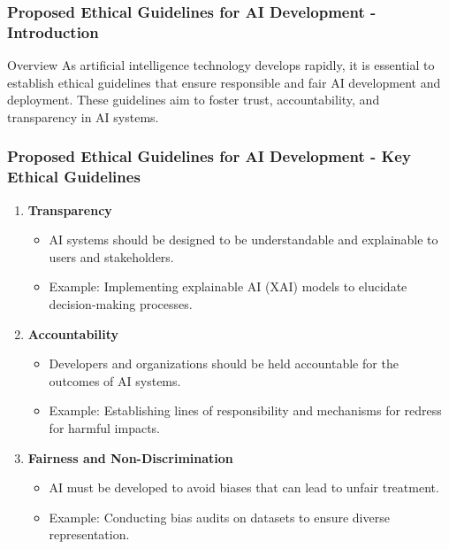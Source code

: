 \documentclass{beamer}
\begin{document}
\begin{frame}[fragile]
    \frametitle{Proposed Ethical Guidelines for AI Development - Introduction}
    \begin{block}{Overview}
        As artificial intelligence technology develops rapidly, it is essential to establish ethical guidelines that ensure responsible and fair AI development and deployment. These guidelines aim to foster trust, accountability, and transparency in AI systems.
    \end{block}
\end{frame}

\begin{frame}[fragile]
    \frametitle{Proposed Ethical Guidelines for AI Development - Key Ethical Guidelines}
    \begin{enumerate}
        \item \textbf{Transparency}
            \begin{itemize}
                \item AI systems should be designed to be understandable and explainable to users and stakeholders.
                \item Example: Implementing explainable AI (XAI) models to elucidate decision-making processes.
            \end{itemize}
        
        \item \textbf{Accountability}
            \begin{itemize}
                \item Developers and organizations should be held accountable for the outcomes of AI systems.
                \item Example: Establishing lines of responsibility and mechanisms for redress for harmful impacts.
            \end{itemize}
    
        \item \textbf{Fairness and Non-Discrimination}
            \begin{itemize}
                \item AI must be developed to avoid biases that can lead to unfair treatment.
                \item Example: Conducting bias audits on datasets to ensure diverse representation.
            \end{itemize}
    \end{enumerate}
\end{frame}
\end{document}
